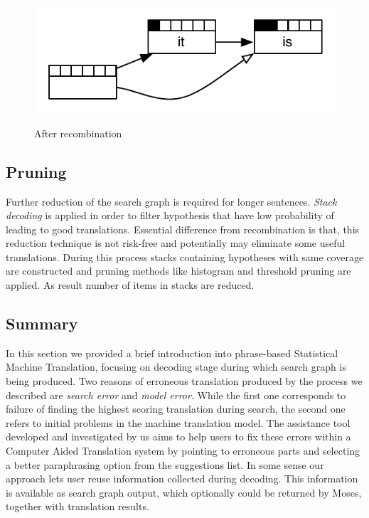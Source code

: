 \begin{figure}
 \centering 
 \includegraphics{g/recombination-example2.pdf}
 \caption{After recombination}
 \caption*{\textit{\cite{Koehn2009a}}}
\end{figure}


\subsection{Pruning}

Further reduction of the search graph is required for longer sentences. \textit{Stack decoding} is applied in order to filter hypothesis that have low probability of leading to good translations. Essential difference from recombination is that, this reduction technique is not risk-free and potentially may eliminate some useful translations. During this process stacks containing hypotheses with same coverage are constructed and pruning methods like histogram and threshold pruning are applied. As result number of items in stacks are reduced. 

\subsection{Summary}

In this section we provided a brief introduction into phrase-based Statistical Machine Translation, focusing on decoding stage during which search graph is being produced. Two reasons of erroneous translation produced by the process we described are \textit{search error} and \textit{model error}. While the first one corresponds to failure of finding the highest scoring translation during search, the second one refers to initial problems in the machine translation model. The assistance tool developed and investigated by us aims to help users to fix these errors within a Computer Aided Translation system by pointing to erroneous parts and selecting a better paraphrasing option from the suggestions list. In some sense our approach lets user reuse information collected during decoding. This information is available as search graph output, which optionally could be returned by Moses, together with translation results. 

